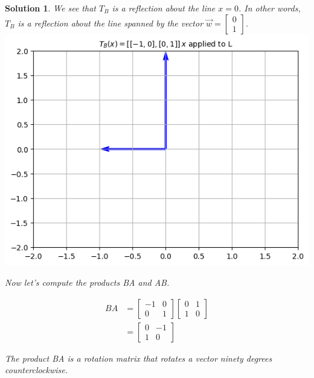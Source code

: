 \documentclass{article}
\newtheorem*{solution}{Solution}
\begin{document}
\begin{solution}
We see that $T_{B}$ is a reflection about the line $x = 0$. In other words, $T_{B}$ is a reflection about the line spanned by the vector $\vec{w} = \begin{bmatrix} 0 \\ 1 \end{bmatrix}$. \\

\includegraphics[scale=0.5, center]{Lreflectxeq0} 

Now let's compute the products BA and AB.

\begin{align*}
BA &= \begin{bmatrix}-1 & 0 \\ 0 & 1 \end{bmatrix} 
\begin{bmatrix}0 & 1 \\ 1 & 0 \end{bmatrix} \\
&= \begin{bmatrix}0 & -1 \\ 1 & 0 \end{bmatrix} 
\end{align*}

The product BA is a rotation matrix that rotates a vector ninety degrees counterclockwise. \\


\end{solution}
\end{document}

